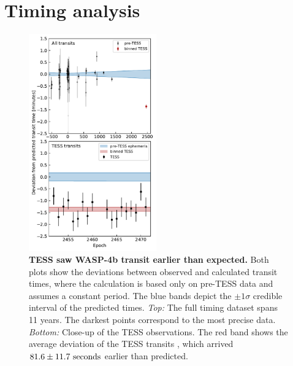 \documentclass[12pt,twocolumn,tighten]{aastex62}
\begin{document}
{%
\section{Timing analysis}
\label{sec:timing}

\begin{figure}[t]
    \begin{center}
        \leavevmode
        \includegraphics[width=0.49\textwidth]{f3.pdf}
    \end{center}
    \vspace{-0.6cm}
    \caption{ {\bf TESS saw WASP-4b transit earlier than expected.}
      Both plots show the deviations between observed and calculated
      transit times, where the calculation is based only on
       pre-TESS data and assumes a constant period.  The
      blue bands depict the $\pm$$1\sigma$ credible interval of the
      predicted times.  {\it Top:} The full timing dataset spans 11
      years. The darkest points correspond to the most precise data.
        {\it Bottom:} Close-up of the TESS observations. The
      red band shows the average deviation of the TESS transits
      \added{($\pm 1\sigma$)}, which arrived $81.6 \pm 11.7\ {\rm
      seconds}$ earlier than predicted.
      \label{fig:arrived_early}
    }
\end{figure}

}
\end{document}
